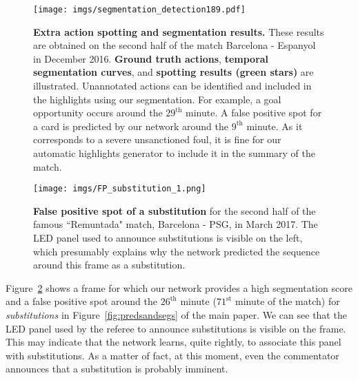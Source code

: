 \documentclass[10pt,twocolumn,letterpaper]{article}
\begin{document}
\begin{figure}
    \centering
    \texttt{[image: imgs/segmentation\_detection189.pdf]}
    \caption{
    \textbf{Extra action spotting and segmentation results.} These results are obtained on the second half of the match Barcelona - Espanyol in December 2016. {\color{anthoblue} \textbf{Ground truth actions}}, {\color{anthoorange}\textbf{temporal segmentation curves}}, and {\color{anthogreen}\textbf{spotting results (green stars)}} are illustrated. Unannotated actions can be identified and included in the highlights using our segmentation. For example, a goal opportunity occurs around the $29^{\text{th}}$ minute. A false positive spot for a card is predicted by our network around the $9^{\text{th}}$ minute. As it corresponds to a severe unsanctioned foul, it is fine for our automatic highlights generator to include it in the summary of the match.
    }
    \label{fig:match_189}
\end{figure}


\begin{figure}
    \centering
    \texttt{[image: imgs/FP\_substitution\_1.png]}
    \caption{
    \textbf{False positive spot of a substitution} for the second half of the famous ``Remuntada" match, Barcelona - PSG, in March 2017. The LED panel used to announce substitutions is visible on the left, which presumably explains why the network predicted the sequence around this frame as a substitution.
    }
    \label{fig:FP_substitution}
\end{figure} 


Figure~\ref{fig:FP_substitution} shows a frame for which our network provides a high segmentation score and a false positive spot around the $26^\text{th}$ minute (\ie $71^\text{st}$ minute of the match) for \emph{substitutions} in Figure~\ref{fig:predsandsegs} of the main paper. We can see that the LED panel used by the referee to announce substitutions is visible on the frame. This may indicate that the network learns, quite rightly, to associate this panel with substitutions. As a matter of fact, at this moment, even the commentator announces that a substitution is probably imminent.   














 
\end{document}
